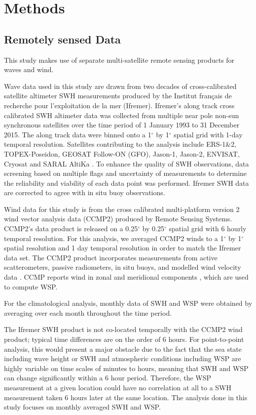 \documentclass[12pt,twoside]{article}
\begin{document}
\section{Methods}

\subsection{Remotely sensed Data}

This study makes use of separate multi-satellite remote sensing products for waves and wind.   

Wave data used in this study are drawn from two decades of cross-calibrated satellite altimeter SWH measurements produced by the Institut fran\c{c}ais de recherche pour l'exploitation de la mer (Ifremer).  Ifremer's along track cross calibrated SWH altimeter data was collected from multiple near pole non-sun synchronous satellites over the time period of 1 January 1993 to 31 December 2015. The along track data were binned onto a 1$^{\circ}$ by 1$^{\circ}$ spatial grid with 1-day temporal resolution. Satellites contributing to the analysis include ERS-1\&2, TOPEX-Poseidon, GEOSAT Follow-ON (GFO), Jason-1, Jason-2, ENVISAT, Cryosat and SARAL AltiKa \cite{Queffeulou2017Global}. To enhance the quality of SWH observations, data screening based on multiple flags and uncertainty of measurements to determine the reliability and viability of each data point was performed. Ifremer SWH data are corrected to agree with in situ buoy observations.

Wind data for this study is from the cross calibrated multi-platform version 2 wind vector analysis data (CCMP2) produced by Remote Sensing Systems. CCMP2's data product is released on a 0.25$^{\circ}$ by 0.25$^{\circ}$ spatial grid with 6 hourly temporal resolution. For this analysis, we averaged CCMP2 winds to a 1$^{\circ}$ by 1$^{\circ}$ spatial resolution and 1 day temporal resolution in order to match the Ifremer data set. The CCMP2 product incorporates measurements from active scatterometers, passive radiometers, in situ buoys, and modelled wind velocity data \cite{Atlas2011Remote}. CCMP reports wind in zonal and meridional components \cite{Atlas2011Remote}, which are used to compute WSP. 

For the climatological analysis, monthly data of SWH and WSP were obtained by averaging over each month throughout the time period.  

The Ifremer SWH product is not co-located temporally with the CCMP2 wind product; typical time differences are on the order of 6 hours. For point-to-point analysis, this would present a major obstacle due to the fact that the sea state including wave height or SWH and atmospheric conditions including WSP are highly variable on time scales of minutes to hours, meaning that SWH and WSP can change significantly within a 6 hour period. Therefore, the WSP measurement at a given location could have no correlation at all to a SWH measurement taken 6 hours later at the same location. The analysis done in this study focuses on monthly averaged SWH and WSP.
\end{document}
